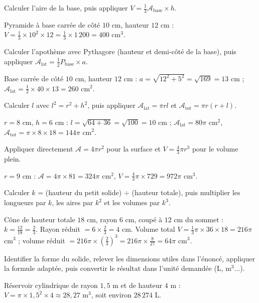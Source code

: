 Calculer l'aire de la base, puis appliquer $V=\frac13\mathcal{A}_{\text{base}}\times h$.
\begin{exemple}
Pyramide à base carrée de côté $10$ cm, hauteur $12$ cm :
$V=\frac13\times10^{2}\times12=\frac13\times1\,200=400$ cm$^{3}$.
\end{exemple}

Calculer l'apothème avec Pythagore (hauteur et demi-côté de la base), puis appliquer
$\mathcal{A}_{\text{lat}}=\frac12P_{\text{base}}\times a$.
\begin{exemple}
Base carrée de côté $10$ cm, hauteur $12$ cm : $a=\sqrt{12^{2}+5^{2}}=\sqrt{169}=13$ cm ;
$\mathcal{A}_{\text{lat}}=\frac12\times40\times13=260$ cm$^{2}$.
\end{exemple}

Calculer $l$ avec $l^{2}=r^{2}+h^{2}$, puis appliquer $\mathcal{A}_{\text{lat}}=\pi rl$ et
$\mathcal{A}_{\text{tot}}=\pi r(r+l)$.
\begin{exemple}
$r=8$ cm, $h=6$ cm : $l=\sqrt{64+36}=\sqrt{100}=10$ cm ; $\mathcal{A}_{\text{lat}}=80\pi$ cm$^{2}$,
$\mathcal{A}_{\text{tot}}=\pi\times8\times18=144\pi$ cm$^{2}$.
\end{exemple}

Appliquer directement $\mathcal{A}=4\pi r^{2}$ pour la surface et $V=\frac43\pi r^{3}$ pour
le volume plein.
\begin{exemple}
$r=9$ cm : $\mathcal{A}=4\pi\times81=324\pi$ cm$^{2}$, $V=\frac43\pi\times729=972\pi$ cm$^{3}$.
\end{exemple}

Calculer $k$ = (hauteur du petit solide) $\div$ (hauteur totale), puis multiplier les
longueurs par $k$, les aires par $k^{2}$ et les volumes par $k^{3}$.
\begin{exemple}
Cône de hauteur totale $18$ cm, rayon $6$ cm, coupé à $12$ cm du sommet : $k=\frac{12}{18}=\frac23$.
Rayon réduit $=6\times\frac23=4$ cm. Volume total $V=\frac13\pi\times36\times18=216\pi$ cm$^{3}$ ;
volume réduit $=216\pi\times\left(\frac23\right)^{3}=216\pi\times\frac{8}{27}=64\pi$ cm$^{3}$.
\end{exemple}

Identifier la forme du solide, relever les dimensions utiles dans l'énoncé, appliquer la
formule adaptée, puis convertir le résultat dans l'unité demandée (L, m$^{3}$...).
\begin{exemple}
Réservoir cylindrique de rayon $1{,}5$ m et de hauteur $4$ m :
$V=\pi\times1{,}5^{2}\times4\approx28{,}27$ m$^{3}$, soit environ $28\,274$ L.
\end{exemple}

